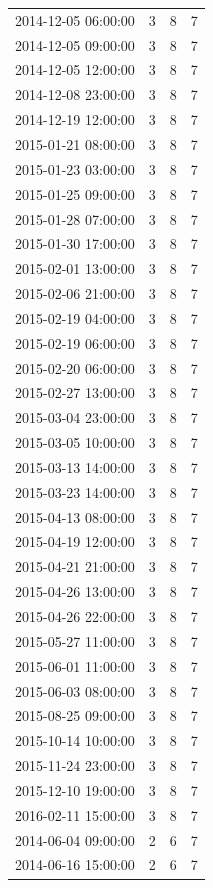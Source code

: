 \begin{tabular}{lrrr}
2014-12-05 06:00:00 & 3 & 8 & 7 \\
2014-12-05 09:00:00 & 3 & 8 & 7 \\
2014-12-05 12:00:00 & 3 & 8 & 7 \\
2014-12-08 23:00:00 & 3 & 8 & 7 \\
2014-12-19 12:00:00 & 3 & 8 & 7 \\
2015-01-21 08:00:00 & 3 & 8 & 7 \\
2015-01-23 03:00:00 & 3 & 8 & 7 \\
2015-01-25 09:00:00 & 3 & 8 & 7 \\
2015-01-28 07:00:00 & 3 & 8 & 7 \\
2015-01-30 17:00:00 & 3 & 8 & 7 \\
2015-02-01 13:00:00 & 3 & 8 & 7 \\
2015-02-06 21:00:00 & 3 & 8 & 7 \\
2015-02-19 04:00:00 & 3 & 8 & 7 \\
2015-02-19 06:00:00 & 3 & 8 & 7 \\
2015-02-20 06:00:00 & 3 & 8 & 7 \\
2015-02-27 13:00:00 & 3 & 8 & 7 \\
2015-03-04 23:00:00 & 3 & 8 & 7 \\
2015-03-05 10:00:00 & 3 & 8 & 7 \\
2015-03-13 14:00:00 & 3 & 8 & 7 \\
2015-03-23 14:00:00 & 3 & 8 & 7 \\
2015-04-13 08:00:00 & 3 & 8 & 7 \\
2015-04-19 12:00:00 & 3 & 8 & 7 \\
2015-04-21 21:00:00 & 3 & 8 & 7 \\
2015-04-26 13:00:00 & 3 & 8 & 7 \\
2015-04-26 22:00:00 & 3 & 8 & 7 \\
2015-05-27 11:00:00 & 3 & 8 & 7 \\
2015-06-01 11:00:00 & 3 & 8 & 7 \\
2015-06-03 08:00:00 & 3 & 8 & 7 \\
2015-08-25 09:00:00 & 3 & 8 & 7 \\
2015-10-14 10:00:00 & 3 & 8 & 7 \\
2015-11-24 23:00:00 & 3 & 8 & 7 \\
2015-12-10 19:00:00 & 3 & 8 & 7 \\
2016-02-11 15:00:00 & 3 & 8 & 7 \\
2014-06-04 09:00:00 & 2 & 6 & 7 \\
2014-06-16 15:00:00 & 2 & 6 & 7 \\

\end{tabular}
